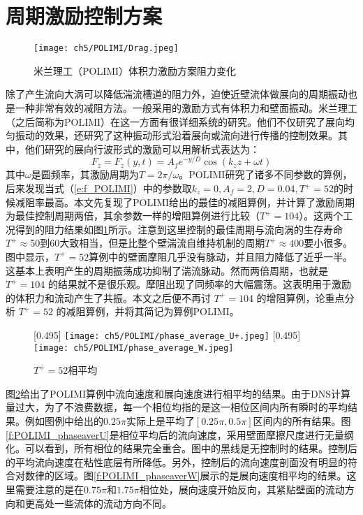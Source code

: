 \section{周期激励控制方案}
\begin{figure}[htb]
  \centering
  \texttt{[image: ch5/POLIMI/Drag.jpeg]}
  \caption{米兰理工（POLIMI）体积力激励方案阻力变化}\label{f:POLIMI_DARG}
\end{figure}
除了产生流向大涡可以降低湍流槽道的阻力外，迫使近壁流体做展向的周期振动也是一种非常有效的减阻方法。一般采用的激励方式有体积力和壁面振动。米兰理工（之后简称为POLIMI）在这一方面有很详细系统的研究\cite{Gatti2016,Gatti2013,Quadrio2009}。他们不仅研究了展向均匀振动的效果，还研究了这种振动形式沿着展向或流向进行传播的控制效果。其中，他们研究的展向行波形式的激励可以用解析式表达为：
\begin{equation}\label{e:f_POLIMI}
  F_z  = F_z \left( {y,t} \right) = A_f e^{ - y/D} \cos \left( k_zz + \omega t \right)
\end{equation}
其中$\omega$是圆频率，其激励周期为$T=2\pi/\omega$。POLIMI研究了诸多不同参数的算例，后来发现当式（\ref{e:f_POLIMI}）中的参数取$k_z=0,A_f=2,D=0.04,T^+=52$的时候减阻率最高。本文先复现了POLIMI给出的最佳的减阻算例，并计算了激励周期为最佳控制周期两倍，其余参数一样的增阻算例进行比较（$T^+=104$）。这两个工况得到的阻力结果如图\ref{f:POLIMI_DARG}所示。注意到这里控制的最佳周期与流向涡的生存寿命$T^+\approx$50\cite{Jimenez1999}到60\cite{del2006}大致相当，但是比整个壁湍流自维持机制的周期$T^+\approx400$\cite{Jimenez2005}要小很多。图中显示，$T^+=52$算例中的壁面摩阻几乎没有脉动，并且阻力降低了近乎一半。这基本上表明产生的周期振荡成功抑制了湍流脉动。然而两倍周期，也就是 $T^+=104$ 的结果就不是很乐观。摩阻出现了同频率的大幅震荡。这表明用于激励的体积力和流动产生了共振。本文之后便不再讨 $T^+=104$ 的增阻算例，论重点分析 $T^+=52$ 的减阻算例，并将其简记为算例POLIMI。

\begin{figure}[htb]
  \centering
  [0.495\textwidth]
    {\texttt{[image: ch5/POLIMI/phase\_average\_U+.jpeg]}}
  [0.495\textwidth]
    {\texttt{[image: ch5/POLIMI/phase\_average\_W.jpeg]}}
  \caption{$T^+=52$相平均}\label{f:POLIMI_phaseaver}
\end{figure}
图\ref{f:POLIMI_phaseaver}给出了POLIMI算例中流向速度和展向速度进行相平均的结果。由于DNS计算量过大，为了不浪费数据，每一个相位均指的是这一相位区间内所有瞬时的平均结果。例如图例中给出的$0.25\pi$实际上是平均了$[0.25\pi,0.5\pi]$区间内的所有结果。图\ref{f:POLIMI_phaseaverU}是相位平均后的流向速度，采用壁面摩擦尺度进行无量纲化。可以看到，所有相位的结果完全重合。图中的黑线是无控制时的结果。控制后的平均流向速度在粘性底层有所降低。另外，控制后的流向速度剖面没有明显的符合对数律的区域。图\ref{f:POLIMI_phaseaverW}展示的是展向速度相平均的结果。这里需要注意的是在$0.75\pi$和$1.75\pi$相位处，展向速度开始反向，其紧贴壁面的流动方向和更高处一些流体的流动方向不同。


